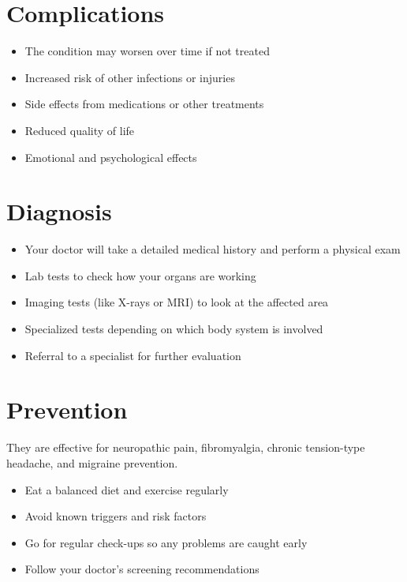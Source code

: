 \section{Complications}

\begin{itemize}[noitemsep]
  \item The condition may worsen over time if not treated
  \item Increased risk of other infections or injuries
  \item Side effects from medications or other treatments
  \item Reduced quality of life
  \item Emotional and psychological effects
\end{itemize}

\section{Diagnosis}

\begin{itemize}[noitemsep]
  \item Your doctor will take a detailed medical history and perform a physical exam
  \item Lab tests to check how your organs are working
  \item Imaging tests (like X-rays or MRI) to look at the affected area
  \item Specialized tests depending on which body system is involved
  \item Referral to a specialist for further evaluation
\end{itemize}

\section{Prevention}
They are effective for neuropathic pain, fibromyalgia, chronic tension-type headache, and migraine prevention.

\begin{itemize}[noitemsep]
  \item Eat a balanced diet and exercise regularly
  \item Avoid known triggers and risk factors
  \item Go for regular check-ups so any problems are caught early
  \item Follow your doctor's screening recommendations
\end{itemize}

